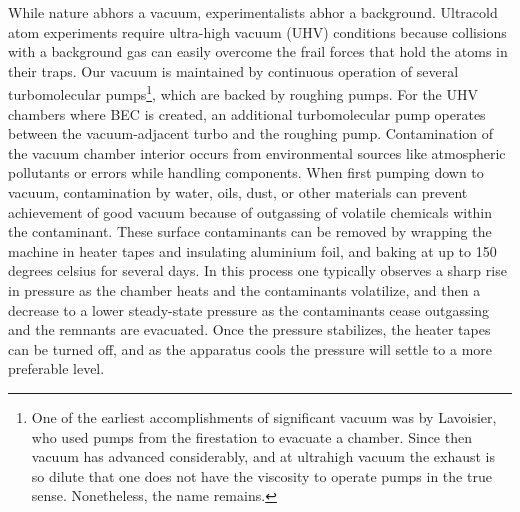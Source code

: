 	While nature abhors a vacuum, experimentalists abhor a background.
	Ultracold atom experiments require ultra-high vacuum (UHV) conditions because collisions with a background gas can easily overcome the frail forces that hold the atoms in their traps.
	Our vacuum is maintained by continuous operation of several turbomolecular pumps\footnote{One of the earliest accomplishments of significant vacuum was by Lavoisier, who used pumps from the firestation to evacuate a chamber.
	Since then vacuum has advanced considerably, and at ultrahigh vacuum the exhaust is so dilute that one does not have the viscosity to operate pumps in the true sense.
	Nonetheless, the name remains.}, which are backed by roughing pumps.
	For the UHV chambers where BEC is created, an additional turbomolecular pump operates between the vacuum-adjacent turbo and the roughing pump.
	 Contamination of the vacuum chamber interior occurs from environmental sources like atmospheric pollutants or errors while handling components.
	When first pumping down to vacuum, contamination by water, oils, dust, or other materials can prevent achievement of good vacuum because of outgassing of volatile chemicals within the contaminant.
	These surface contaminants can be removed by wrapping the machine in heater tapes and insulating aluminium foil, and baking at up to 150 degrees celsius for several days.
	In this process one typically observes a sharp rise in pressure as the chamber heats and the contaminants volatilize, and then a decrease to a lower steady-state pressure as the contaminants cease outgassing and the remnants are evacuated.
	Once the pressure stabilizes, the heater tapes can be turned off, and as the apparatus cools the pressure will settle to a more preferable level.
	
	

	

